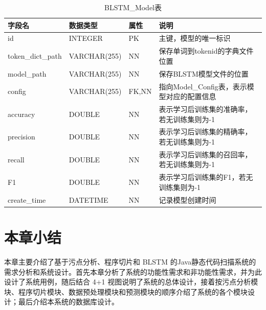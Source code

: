 \begin{table}[!htbp]\footnotesize %
	\centering
	\caption{BLSTM\_Model表}
	\vspace{2mm}
	\begin{tabular}{llll}
		\toprule
		\textbf{字段名}&\textbf{数据类型}&\textbf{属性}&\textbf{说明}\\
		\midrule
		id&INTEGER&PK&主键，模型的唯一标识\\
		token\_dict\_path &VARCHAR(255)&NN&保存单词到tokenid的字典文件位置\\
		model\_path		 &VARCHAR(255)&NN&保存BLSTM模型文件的位置\\
		config				 &VARCHAR(255)&FK,NN&指向Model\_Config表，表示模型对应的配置信息\\
		accuracy	&DOUBLE&NN&表示学习后训练集的准确率，若无训练集则为-1\\
		precision	&DOUBLE&NN&表示学习后训练集的精确率，若无训练集则为-1\\
		recall	&DOUBLE&NN&表示学习后训练集的召回率，若无训练集则为-1\\
		F1	&DOUBLE&NN&表示学习后训练集的F1，若无训练集则为-1\\
		create\_time		  &DATETIME&NN&记录模型创建时间\\
		\bottomrule
	\end{tabular}
	\label{sql:lstmModelTable}
\end{table}

\section{本章小结}

本章主要介绍了基于污点分析、程序切片和 BLSTM 的Java静态代码扫描系统的需求分析和系统设计。首先本章分析了系统的功能性需求和非功能性需求，并为此设计了系统用例，随后结合 4+1 视图说明了系统的总体设计，接着按污点分析模块、程序切片模块、数据预处理模块和预测模块的顺序介绍了系统的各个模块设计；最后介绍本系统的数据库设计。

